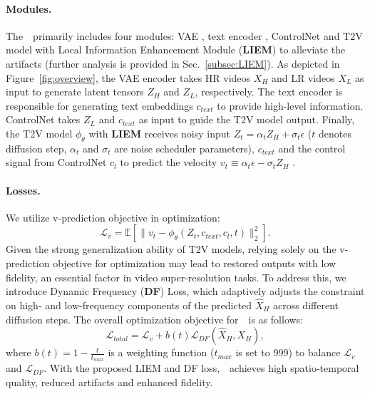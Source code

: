 \paragraph{Modules.}
The~\name~primarily includes four modules: VAE \cite{kingma2013auto}, text encoder \cite{radford2021learning, raffel2020exploring}, ControlNet \cite{zhang2023adding} and T2V model \cite{zhang2023i2vgen, yang2024cogvideox} with Local Information Enhancement Module (\textbf{LIEM}) to alleviate the artifacts (further analysis is provided in Sec.~\ref{subsec:LIEM}). 
As depicted in Figure~\ref{fig:overview}, the VAE encoder takes HR videos $X_H$ and LR videos $X_L$ as input to generate latent tensors $Z_H$ and $Z_L$, respectively. The text encoder is responsible for generating text embeddings $c_{text}$ to provide high-level information. ControlNet takes $Z_L$ and $c_{text}$ as input to guide the T2V model output. Finally, the T2V model $\phi_\theta$ with \textbf{LIEM} receives noisy input $Z_t = \alpha_t Z_H + \sigma_t \epsilon$ ($t$ denotes diffusion step, $\alpha_t$ and $\sigma_t$ are noise scheduler parameters), $c_{text}$ and the control signal from ControlNet $c_{l}$ to predict the velocity $v_t \equiv \alpha_t \epsilon - \sigma_t Z_H$ \cite{salimans2022progressive}. 

\vspace{-1em}
\paragraph{Losses.}
We utilize v-prediction objective in optimization:
\begin{equation}
    \mathcal{L}_{v} = \mathbb{E}[\| v_t - \phi_\theta(Z_t, c_{text}, c_{l}, t) \|_2^2].
\end{equation}
%
Given the strong generalization ability of T2V models, relying solely on the v-prediction objective for optimization may lead to restored outputs with low fidelity, an essential factor in video super-resolution tasks. 
To address this, we introduce Dynamic Frequency (\textbf{DF}) Loss, which adaptively adjusts the constraint on high- and low-frequency components of the predicted $\hat{X}_H$ across different diffusion steps. 
The overall optimization objective for~\name~is as follows:
%
\begin{equation}
    \mathcal{L}_{total} = \mathcal{L}_{v} + b(t)\mathcal{L}_{DF}(\hat{X}_H, X_H),
\end{equation}
where $b(t)= 1 - \frac{t}{t_{max}}$ is a weighting function ($t_{max}$ is set to 999) to balance $\mathcal{L}_{v}$ and $\mathcal{L}_{DF}$. 
With the proposed LIEM and DF loss,~\name~achieves high spatio-temporal quality, reduced artifacts and enhanced fidelity.

